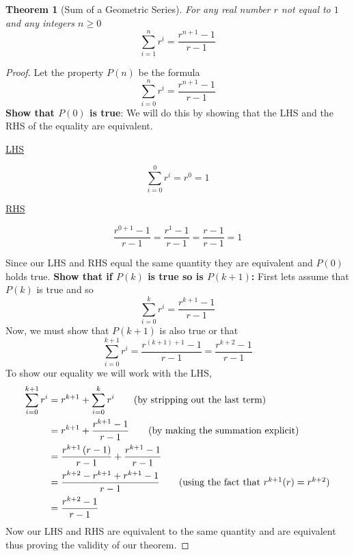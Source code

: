 \documentclass[addpoints]{exam}
\newtheorem{theorem}{Theorem}
\begin{document}
    \begin{theorem}[Sum of a Geometric Series]
      For any real number $r$ not equal to $1$ and any integers $n \geq 0$
      \[
      \sum\limits_{i=1}^{n} r^{i} = \frac{r^{n+1} - 1}{r-1}
      \]
    \end{theorem}
    \ifprintanswers
    \begin{proof}
      Let the property $P(n)$ be the formula 
      \[
        \sum\limits_{i=0}^{n} r^{i} = \frac{r^{n+1}-1}{r-1}
      \]
      \textbf{Show that $P(0)$ is true}: We will do this by showing that the LHS and the RHS of the equality are equivalent.
      \begin{minipage}[t]{0.45\linewidth}
        \begin{center}
          \underline{LHS}
        \end{center}
        \[
          \sum\limits_{i=0}^{0} r^{i} = r^{0} = 1
        \]
      \end{minipage}
      \hfill
      \begin{minipage}[t]{0.45\linewidth}
        \begin{center}
          \underline{RHS}
        \end{center}
        \[
          \frac{r^{0+1}-1}{r-1} = \frac{r^1-1}{r-1} = \frac{r-1}{r-1} = 1
        \]
      \end{minipage}
      \vspace{0.2in}\newline Since our LHS and RHS equal the same quantity they are equivalent and $P(0)$ holds true.
      \newline \textbf{Show that if $P(k)$ is true so is $P(k+1)$:} First lets assume that $P(k)$ is true and so 
      \[
        \sum\limits_{i=0}^{k} r^i = \frac{r^{k+1}-1}{r-1}
      \]
      Now, we must show that $P(k+1)$ is also true or that
      \[
        \sum\limits_{i=0}^{k+1} r^i = \frac{r^{(k+1)+1}-1}{r-1} = \frac{r^{k+2}-1}{r-1}
      \]
      To show our equality we will work with the LHS, 
      \begin{align*}
        \sum\limits_{i=0}^{k+1} r^i &= r^{k+1} + \sum\limits_{i=0}^{k} r^i \tag{by stripping out the last term} \\ 
        &= r^{k+1} + \frac{r^{k+1}-1}{r-1} \tag{by making the summation explicit} \\ 
        &= \frac{r^{k+1}\left(r-1\right)}{r-1} + \frac{r^{k+1}-1}{r-1} \\ 
        &= \frac{r^{k+2} - r^{k+1} + r^{k+1}-1}{r-1} \tag{using the fact that $r^{k+1}(r) = r^{k+2}$} \\ 
        &= \frac{r^{k+2}-1}{r-1}
      \end{align*}
      Now our LHS and RHS are equivalent to the same quantity and are equivalent thus proving the validity of our theorem.
    \end{proof}
\end{document}
